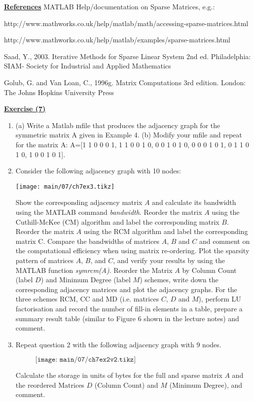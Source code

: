 \vskip 20pt
\noindent
{\bf\underline {References}}
\vskip 10pt
\noindent
MATLAB Help/documentation on Sparse Matrices, e.g.:

http://www.mathworks.co.uk/help/matlab/math/accessing-sparse-matrices.html

http://www.mathworks.co.uk/help/matlab/examples/sparse-matrices.html


\noindent
Saad, Y., 2003. Iterative Methods for Sparse Linear System 2nd ed. Philadelphia:
SIAM- Society for Industrial and Applied Mathematics

\noindent
Golub, G. and Van Loan, C., 1996g. Matrix Computations 3rd edition. London: The
Johns Hopkins University Press

\newpage

{\bf\underline {Exercise (7)}}

\vskip 4pt
\noindent
\begin{enumerate}
\item (a) Write a Matlab mfile that produces the adjacency graph for the
symmetric matrix A given in Example 4. (b) Modify your mfile and repeat for the 
matrix A:
A=[1 1 0 0 0 1, 1 1 0 0 1 0, 0 0 1 0 1 0, 0 0 0 1 0 1, 0 1 1 0 1 0, 1 0 0 1 0 1].
\vskip 2pt
\item {Consider the following adjacency graph with 10 nodes:
\vskip -6pt
\begin{table}[H]
\hspace*{20mm} \texttt{[image: main/07/ch7ex3.tikz]}
\end{table}
\parskip -10pt
\noindent
Show the corresponding adjacency matrix $A$ and calculate its bandwidth using
the MATLAB command \emph{bandwidth}. Reorder the matrix $A$ using the Cuthill-McKee (CM)
algorithm and label the corresponding matrix $B$. Reorder the matrix $A$ using
the RCM algorithm and label the corresponding matrix C. Compare the bandwidths
of matrices $A$, $B$ and $C$ and comment on the computational efficiency when
using matrix re-ordering. Plot the sparsity pattern of matrices $A$, $B$, and
$C$, and verify your results by using the MATLAB function {\it symrcm(A)}.
Reorder the Matrix $A$ by Column Count (label $D$) and Minimum Degree (label
$M$) schemes, write down the corresponding adjacency matrices and plot the
adjacency graphs. For the three schemes RCM, CC and MD (i.e. matrices $C$, $D$
and $M$), perform LU factorisation and record the number of fill-in elements in
a table, prepare a summary result table (similar to Figure 6 shown in the
lecture notes) and comment.}
\vskip 4pt
\item Repeat question 2 with the following adjacency graph with 9 nodes.
\begin{figure}[H]
\hspace*{20mm}$\texttt{[image: main/07/ch7ex2v2.tikz]}$
\end{figure}
\parskip -10pt
\noindent
Calculate the storage in units of bytes for the full and sparse matrix $A$ and
the reordered Matrices $D$ (Column Count) and $M$ (Minimum Degree), and comment.
\end{enumerate}

